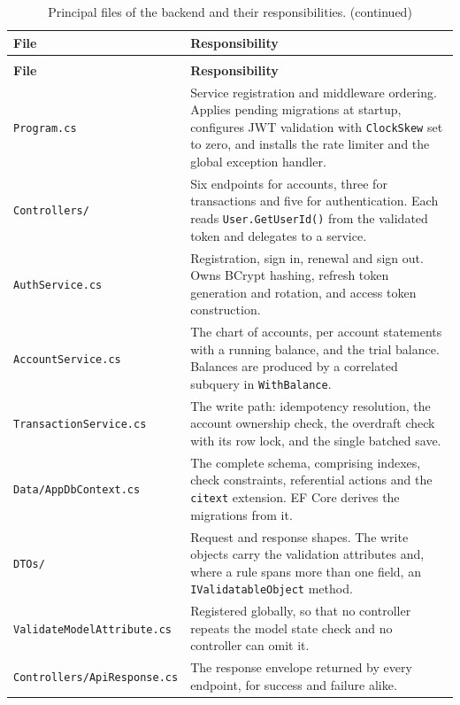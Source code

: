 \documentclass[11pt,a4paper]{article}
\newcommand{\code}[1]{\texttt{\fontsize{8.6}{10}\selectfont #1}}
\begin{document}
{\setlength{\LTpre}{8pt}\setlength{\LTpost}{8pt}
\begin{longtable}{@{}p{5.0cm}p{10.0cm}@{}}
\caption{Principal files of the backend and their responsibilities.}
\label{tab:backend}\\
\toprule
\textbf{\sffamily\small File} & \textbf{\sffamily\small Responsibility}\\
\midrule
\endfirsthead
\caption[]{Principal files of the backend and their responsibilities. (continued)}\\
\toprule
\textbf{\sffamily\small File} & \textbf{\sffamily\small Responsibility}\\
\midrule
\endhead
\bottomrule
\endlastfoot
\code{Program.cs} &
  Service registration and middleware ordering. Applies pending migrations at
  startup, configures JWT validation with \code{ClockSkew} set to zero, and
  installs the rate limiter and the global exception handler.\\
\code{Controllers/} &
  Six endpoints for accounts, three for transactions and five for
  authentication. Each reads \code{User.GetUserId()} from the validated token
  and delegates to a service.\\
\code{AuthService.cs} &
  Registration, sign in, renewal and sign out. Owns BCrypt hashing, refresh
  token generation and rotation, and access token construction.\\
\code{AccountService.cs} &
  The chart of accounts, per account statements with a running balance, and the
  trial balance. Balances are produced by a correlated subquery in
  \code{WithBalance}.\\
\code{TransactionService.cs} &
  The write path: idempotency resolution, the account ownership check, the
  overdraft check with its row lock, and the single batched save.\\
\code{Data/AppDbContext.cs} &
  The complete schema, comprising indexes, check constraints, referential
  actions and the \code{citext} extension. EF Core derives the migrations from
  it.\\
\code{DTOs/} &
  Request and response shapes. The write objects carry the validation
  attributes and, where a rule spans more than one field, an
  \code{IValidatableObject} method.\\
\code{ValidateModelAttribute.cs} &
  Registered globally, so that no controller repeats the model state check and
  no controller can omit it.\\
\code{Controllers/ApiResponse.cs} &
  The response envelope returned by every endpoint, for success and failure
  alike.\\
\end{longtable}}
\end{document}
